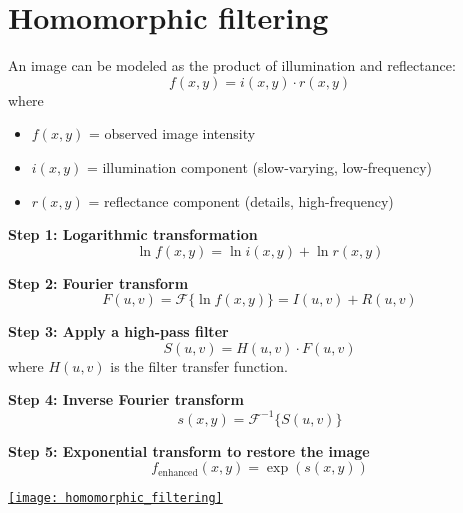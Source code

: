 
\section{Homomorphic filtering}


An image can be modeled as the product of illumination and reflectance:
\[
f(x, y) = i(x, y) \cdot r(x, y)
\]
where
\begin{itemize}
    \item $f(x, y)$ = observed image intensity
    \item $i(x, y)$ = illumination component (slow-varying, low-frequency)
    \item $r(x, y)$ = reflectance component (details, high-frequency)
\end{itemize}

\textbf{Step 1: Logarithmic transformation}
\[
\ln f(x, y) = \ln i(x, y) + \ln r(x, y)
\]

\textbf{Step 2: Fourier transform}
\[
F(u, v) = \mathcal{F}\{\ln f(x, y)\} = I(u, v) + R(u, v)
\]

\textbf{Step 3: Apply a high-pass filter}
\[
S(u, v) = H(u, v) \cdot F(u, v)
\]
where $H(u,v)$ is the filter transfer function.

\textbf{Step 4: Inverse Fourier transform}
\[
s(x, y) = \mathcal{F}^{-1}\{S(u, v)\}
\]

\textbf{Step 5: Exponential transform to restore the image}
\[
f_{\text{enhanced}}(x, y) = \exp(s(x, y))
\]

\begin{center}
  \href{https://github.com/vicente-gonzalez-ruiz/medical_imaging/blob/main/notebooks/homomorphic_filtering.ipynb}{\texttt{[image: homomorphic\_filtering]}}
\end{center}


